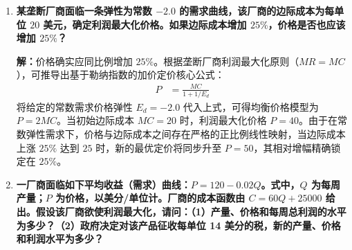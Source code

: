 \begin{enumerate}[label=\textbf{\arabic*.}, leftmargin=*]
		\textbf{答：}作为具备显著市场势力的寡头垄断厂商，该公司评估提价效应的核心在于准确测算其产品所面临的残余需求价格弹性。为量化价格提高 $5\%$ 导致的销量损失，必须系统收集并分析以下四大关键变量。
		
		首先，需明确市场上竞争对手产品的相近替代程度；若竞争机型构成完美的接近替代品，微小的价格上浮将导致极高的交叉弹性效应，迫使客户大量倒戈。
		
		评估存量设备的平均使用折旧状态；作为耐用品，若当前市场上的拖拉机普遍尚未到达报废更新期，客户将倾向于推迟购买，表现为需求对涨价极为敏感。
		
		测算下游农业部门的预期资本收益率；若宏观农产品价格低迷导致农场预期利润下滑，农业投资萎缩将大幅放大提价所诱发的销量下跌幅度。
		
		预测竞争对手的反制策略；若竞争者出于维持寡头默契而选择同步涨价，卡特彼勒的相对价格优势并未受损，其销量降幅将显著小于单方面涨价引发的断崖式下跌。
		
		\newpage
		\item \textbf{某垄断厂商面临一条弹性为常数 $-2.0$ 的需求曲线，该厂商的边际成本为每单位 $20$ 美元，确定利润最大化价格。如果边际成本增加 $25\%$，价格是否也应该增加 $25\%$？}
		
		\textbf{解：}价格确实应同比例增加 $25\%$。根据垄断厂商利润最大化原则（$MR = MC$），可推导出基于勒纳指数的加价定价核心公式：
		\[
		\begin{aligned}
			P &= \frac{MC}{1 + 1/E_d}
		\end{aligned}
		\]
		将给定的常数需求价格弹性 $E_d = -2.0$ 代入上式，可得均衡价格模型为 $P = 2MC$。当初始边际成本 $MC = 20$ 时，利润最大化价格 $P = 40$。由于在常数弹性需求下，价格与边际成本之间存在严格的正比例线性映射，当边际成本上涨 $25\%$ 达到 $25$ 时，新的最优定价将同步升至 $P = 50$，其相对增幅精确锁定在 $25\%$。
		
		\item \textbf{一厂商面临如下平均收益（需求）曲线：$P = 120 - 0.02Q$。式中，$Q$ 为每周产量；$P$ 为价格，以美分/单位计。厂商的成本函数由 $C = 60Q + 25000$ 给出。假设该厂商欲使利润最大化，请问：（1）产量、价格和每周总利润的水平为多少？（2）政府决定对该产品征收每单位 14 美分的税，新的产量、价格和利润水平为多少？}
		

\end{enumerate}
